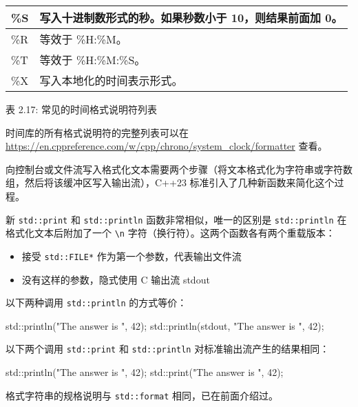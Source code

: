 \begin{longtable}{|l|l|}
\%S & 写入十进制数形式的秒。如果秒数小于 10，则结果前面加 0。                                         \\ \hline
\%R                           & 等效于 \%H:\%M。                                                                                      \\ \hline
\%T                           & 等效于 \%H:\%M:\%S。                                                                                  \\ \hline
\%X                           & 写入本地化的时间表示形式。                                                                             \\ \hline
\end{longtable}

\begin{center}
表 2.17: 常见的时间格式说明符列表
\end{center}

时间库的所有格式说明符的完整列表可以在 \url{https://en.cppreference.com/w/cpp/chrono/system_clock/formatter} 查看。

向控制台或文件流写入格式化文本需要两个步骤（将文本格式化为字符串或字符数组，然后将该缓冲区写入输出流），C++23 标准引入了几种新函数来简化这个过程。

新 \verb|std::print| 和 \verb|std::println| 函数非常相似，唯一的区别是 \verb|std::println| 在格式化文本后附加了一个 \verb|\n| 字符（换行符）。这两个函数各有两个重载版本：

\begin{itemize}
\item
接受 \verb|std::FILE*| 作为第一个参数，代表输出文件流

\item
没有这样的参数，隐式使用 C 输出流 stdout
\end{itemize}

以下两种调用 \verb|std::println| 的方式等价：

\begin{cpp}
std::println("The answer is {}", 42);
std::println(stdout, "The answer is {}", 42);
\end{cpp}

以下两个调用 \verb|std::print| 和 \verb|std::println| 对标准输出流产生的结果相同：

\begin{cpp}
std::println("The answer is {}", 42);
std::print("The answer is {}\n", 42);
\end{cpp}

格式字符串的规格说明与 \verb|std::format| 相同，已在前面介绍过。


